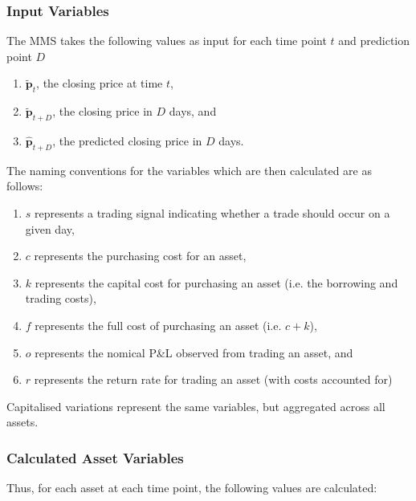 \documentclass[a4paper,11pt,oneside]{article}
\theoremstyle{plain}
\theoremstyle{definition}
\begin{document}
	\subsubsection{Input Variables}
	
	The MMS takes the following values as input for each time point $t$  and prediction point $D$
	\begin{enumerate}
		\item {$\mathbf{\tilde{p}}_t$}, the closing price at time $t$, 
		\item $\mathbf{\tilde{p}}_{t+D}$, the closing price in $D$ days, and
		\item $\hat{\mathbf{p}}_{t+D}$, the predicted closing price in $D$ days.
	\end{enumerate}
	
	The naming conventions for the variables which are then calculated are as follows:
	
		\begin{enumerate}
		\item $s$ represents a trading signal indicating whether a trade should occur on a given day, 
		\item $c$ represents the purchasing cost for an asset, 
		\item $k$ represents the capital cost for purchasing an asset (i.e. the borrowing and trading costs), 
		\item $f$ represents the full cost of purchasing an asset (i.e. $c +k$), 
		\item $o$ represents the nomical P\&L observed from trading an asset, and
		\item $r$ represents the return rate  for trading an asset (with costs accounted for)
	\end{enumerate}
	
	Capitalised variations represent the same variables, but aggregated across all assets.
	
	\subsubsection{Calculated Asset Variables}
	
	Thus, for each asset at each time point, the following values are calculated:
	
\end{document}

